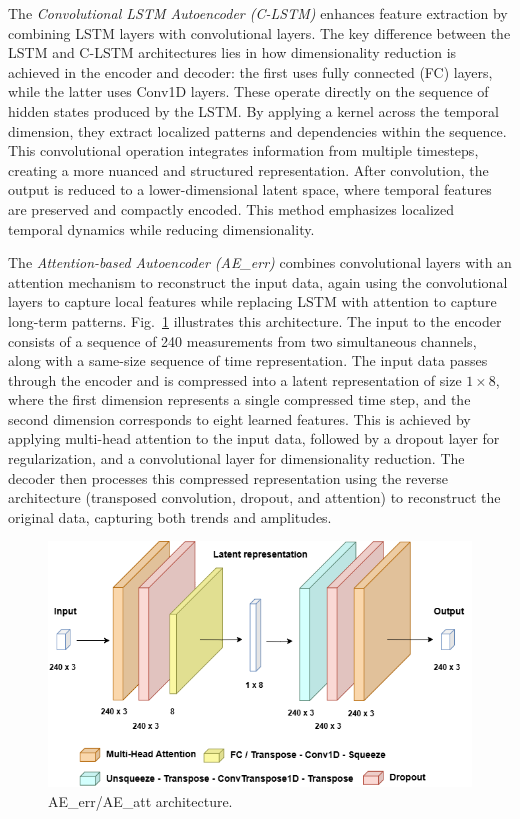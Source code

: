 \documentclass[runningheads]{llncs}
\begin{document}
The \emph{Convolutional LSTM Autoencoder (C-LSTM)} enhances feature
extraction by combining LSTM layers with convolutional layers. The
key difference between the LSTM and C-LSTM architectures lies in how
dimensionality reduction is achieved in the encoder and decoder: the
first uses fully connected (FC) layers, while the latter uses
Conv1D layers. These operate directly on the sequence of hidden states
produced by the LSTM. By applying a kernel across the temporal
dimension, they extract localized patterns and dependencies within the
sequence. This convolutional operation integrates information from
multiple timesteps, creating a more nuanced and structured
representation. After convolution, the output is reduced to a
lower-dimensional latent space, where temporal features are preserved
and compactly encoded. This method emphasizes localized temporal
dynamics while reducing dimensionality.

The \emph{Attention-based Autoencoder (AE\_err)}
combines convolutional layers with an attention mechanism to
reconstruct the input data, again using the convolutional layers to
capture local features while replacing LSTM with attention to capture
long-term patterns.
%
Fig.~\ref{fig:Fig2} illustrates this architecture. The input to the
encoder consists of a sequence of 240 measurements from two
simultaneous channels, along with a same-size sequence of time
representation. The input data passes through the encoder and is
compressed into a latent representation of size \( 1 \times 8 \),
where the first dimension represents a single compressed time step,
and the second dimension corresponds to eight learned features. This
is achieved by applying multi-head attention to the input data,
followed by a dropout layer for regularization, and a convolutional
layer for dimensionality reduction. The decoder then processes this
compressed representation using the reverse architecture (transposed
convolution, dropout, and attention) to reconstruct the original data,
capturing both trends and amplitudes.

\begin{figure}[tb]
\centering
\includegraphics[width=0.9\columnwidth]{images/Fig2.png}  
\caption{\label{fig:Fig2} AE\_err/AE\_att architecture.}
\end{figure}
\end{document}
